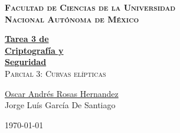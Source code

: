 \documentclass[12pt, fleqn]{report}                             %
\author{Oscar Andrés Rosas}                                     %
\theoremstyle{break}                                            %
\begin{document}
\begin{titlepage}

    \pagecolor{TitlePageColor}                                      %
    \color{white}                                                   %

    \vspace                                                         %
    \baselineskip                                                   %

    \makebox[0pt][l]{\rule{1.3\textwidth}{3pt}}                     %

    \textbf{\textsc{\Large Facultad de Ciencias de la Universidad \\ Nacional Autónoma de México}}                %
    \vspace{2.7cm}                                                  %

    \href{ProjectNameLink/Book}                                     %
    {\fontsize{55}{68}\selectfont \textbf{Tarea 3 de  \\[0.4cm] Criptografía y \\[0.4cm] Seguridad}}\\[0.5cm]     %
    \textcolor{ColorSubtext}{\textsc{\Huge Parcial 3: Curvas elípticas}}              %

    \vfill                                                          %

    \href{https://soyoscarrh.github.io/}                            %
    {\LARGE \textsf{Oscar Andrés Rosas Hernandez}} \\[0.5cm]        %
    {\LARGE \textsf{Jorge Luís García De Santiago}}                 %

    \vspace                                                         %
    \baselineskip                                                   %

    {\large \textsf{\today}}                                  %

\end{titlepage}
\end{document}
